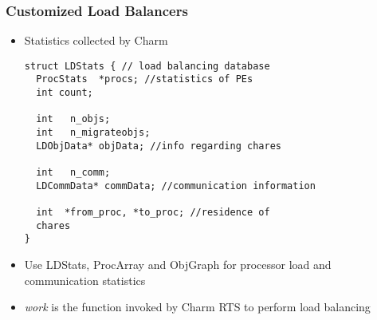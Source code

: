 \begin{frame}[fragile]
\frametitle{Customized Load Balancers}
\begin{itemize}
\item Statistics collected by Charm
\begin{lstlisting}[basicstyle=\tiny]
struct LDStats { // load balancing database
  ProcStats  *procs; //statistics of PEs
  int count;

  int   n_objs;
  int   n_migrateobjs;
  LDObjData* objData; //info regarding chares

  int   n_comm;
  LDCommData* commData; //communication information

  int  *from_proc, *to_proc; //residence of
  chares
}
\end{lstlisting}
\item Use LDStats, ProcArray and ObjGraph for processor load and communication
statistics
\item \emph{work} is the function invoked by Charm RTS to perform load balancing
\end{itemize}
\end{frame}


